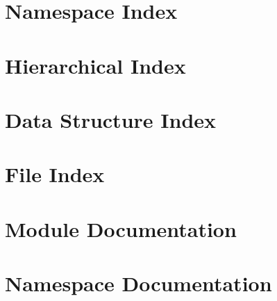 \documentclass[twoside]{book}
\newcommand{\+}{\discretionary{\mbox{\scriptsize$\hookleftarrow$}}{}{}}
\begin{document}
\chapter{Namespace Index}

\chapter{Hierarchical Index}

\chapter{Data Structure Index}

\chapter{File Index}

\chapter{Module Documentation}















\chapter{Namespace Documentation}


\end{document}
